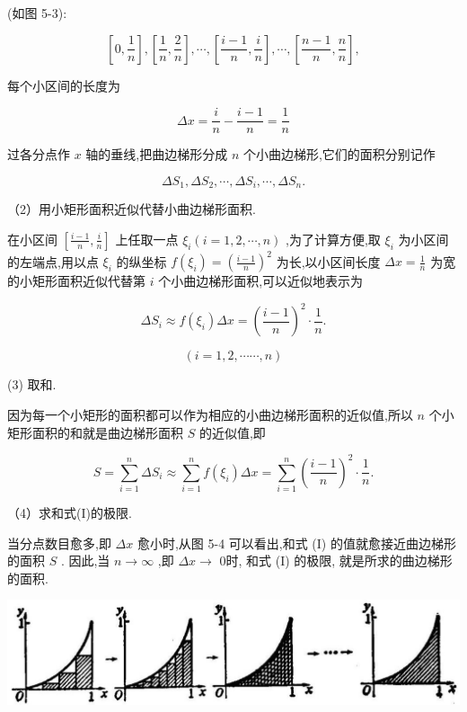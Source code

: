 \documentclass[lang=cn,newtx,12pt,scheme=chinese]{elegantbook}
\begin{document}
(如图 5-3):

\[
\left\lbrack {0,\frac{1}{n}}\right\rbrack ,\left\lbrack {\frac{1}{n},\frac{2}{n}}\right\rbrack ,\cdots ,\left\lbrack {\frac{i - 1}{n},\frac{i}{n}}\right\rbrack ,\cdots ,\left\lbrack {\frac{n - 1}{n},\frac{n}{n}}\right\rbrack ,
\]

每个小区间的长度为

\[
{\Delta x} = \frac{i}{n} - \frac{i - 1}{n} = \frac{1}{n}
\]

过各分点作 \(x\) 轴的垂线,把曲边梯形分成 \(n\) 个小曲边梯形,它们的面积分别记作

\[
\Delta {S}_{1},\Delta {S}_{2},\cdots ,\Delta {S}_{i},\cdots ,\Delta {S}_{n}.
\]

（2）用小矩形面积近似代替小曲边梯形面积.

在小区间 \(\left\lbrack {\frac{i - 1}{n},\frac{i}{n}}\right\rbrack\) 上任取一点 \({\xi }_{i}\left( {i = 1,2,\cdots ,n}\right)\) ,为了计算方便,取 \({\xi }_{i}\) 为小区间的左端点,用以点 \({\xi }_{i}\) 的纵坐标 \(f\left( {\xi }_{i}\right) = {\left( \frac{i - 1}{n}\right) }^{2}\) 为长,以小区间长度 \({\Delta x} = \frac{1}{n}\) 为宽的小矩形面积近似代替第 \(i\) 个小曲边梯形面积,可以近似地表示为

\[
\Delta {S}_{i} \approx f\left( {\xi }_{i}\right) {\Delta x} = {\left( \frac{i - 1}{n}\right) }^{2} \cdot \frac{1}{n}.
\]

\[
\left( {i = 1,2,\cdots \cdots ,n}\right)
\]

(3) 取和.

因为每一个小矩形的面积都可以作为相应的小曲边梯形面积的近似值,所以 \(n\) 个小矩形面积的和就是曲边梯形面积 \(S\) 的近似值,即

\[
S = \mathop{\sum }\limits_{{i = 1}}^{n}\Delta {S}_{i} \approx \mathop{\sum }\limits_{{i = 1}}^{n}f\left( {\xi }_{i}\right) {\Delta x} = \mathop{\sum }\limits_{{i = 1}}^{n}{\left( \frac{i - 1}{n}\right) }^{2} \cdot \frac{1}{n}. \tag{I}
\]

（4）求和式(I)的极限.

当分点数目愈多,即 \({\Delta x}\) 愈小时,从图 5-4 可以看出,和式 (I) 的值就愈接近曲边梯形的面积 \(S\) . 因此,当 \(n \rightarrow \infty\) ,即 \({\Delta x} \rightarrow\) 0时, 和式 (I) 的极限, 就是所求的曲边梯形的面积.

\begin{center}
\includegraphics[max width=1.0\textwidth]{images/01912c18-5c3f-733d-b775-749ba9897a9d_218_835855.jpg}
\end{center}
\end{document}
